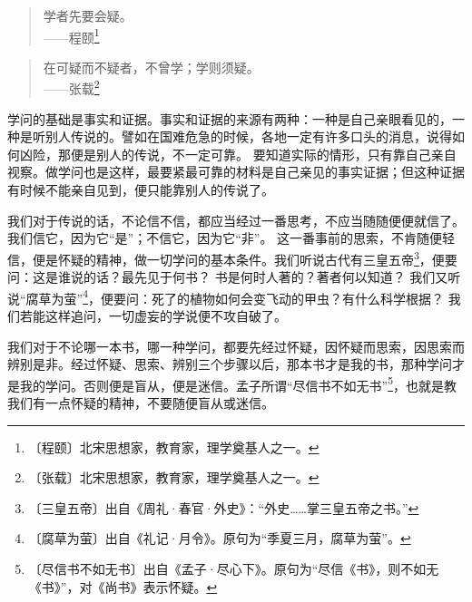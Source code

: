 \documentclass[12pt,UTF-8,openany]{ctexbook}
\begin{document}
\begin{large}
    
    \begin{quotation}
    
    学者先要会疑。\\
    
    \hfill ——程颐\footnote{〔程颐〕北宋思想家，教育家，理学奠基人之一。}
    
    \end{quotation}
    
    \begin{quotation}
    
    在可疑而不疑者，不曾学；学则须疑。\\
    
    \hfill ——张载\footnote{〔张载〕北宋思想家，教育家，理学奠基人之一。}
    
    \end{quotation}
    
    学问的基础是事实和证据。事实和证据的来源有两种：一种是自己亲眼看见的，一种是听别人传说的。譬如在国难危急的时候，各地一定有许多口头的消息，说得如何凶险，那便是别人的传说，不一定可靠。 要知道实际的情形，只有靠自己亲自视察。做学问也是这样，最要紧最可靠的材料是自己亲见的事实证据；但这种证据有时候不能亲自见到，便只能靠别人的传说了。
    
    我们对于传说的话，不论信不信，都应当经过一番思考，不应当随随便便就信了。我们信它，因为它“是”；不信它，因为它“非”。 这一番事前的思索，不肯随便轻信，便是怀疑的精神，做一切学问的基本条件。我们听说古代有三皇五帝\footnote{〔三皇五帝〕出自《周礼·春官·外史》：“外史……掌三皇五帝之书。”}，便要问：这是谁说的话？最先见于何书？ 书是何时人著的？著者何以知道？ 我们又听说“腐草为萤”\footnote{〔腐草为萤〕出自《礼记·月令》。原句为“季夏三月，腐草为萤”。}，便要问：死了的植物如何会变飞动的甲虫？有什么科学根据？ 我们若能这样追问，一切虚妄的学说便不攻自破了。
    
    我们对于不论哪一本书，哪一种学问，都要先经过怀疑，因怀疑而思索，因思索而辨别是非。经过怀疑、思索、辨别三个步骤以后，那本书才是我的书，那种学问才是我的学问。否则便是盲从，便是迷信。孟子所谓“尽信书不如无书”\footnote{〔尽信书不如无书〕出自《孟子·尽心下》。原句为“尽信《书》，则不如无《书》”，对《尚书》表示怀疑。}，也就是教我们有一点怀疑的精神，不要随便盲从或迷信。
    

\end{large}
\end{document}
